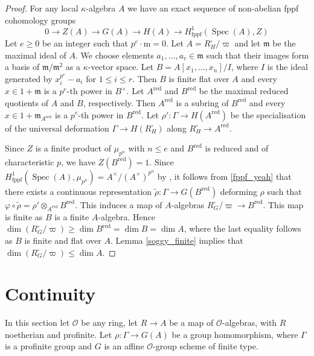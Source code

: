 \documentclass{amsart}
\theoremstyle{definition}
\theoremstyle{remark}
\newcommand{\stackcite}[1]{\cite[\href{https://stacks.math.columbia.edu/tag/#1}{Tag #1}]{stacks-project}}
\DeclareMathOperator{\Spec}{Spec}
\newcommand{\mm}{\mathfrak m}
\newcommand{\OO}{\mathcal O}
\newcommand{\md}{\mathrm m}
\newcommand{\red}{\mathrm{red}}
\begin{document}
\begin{proof} For any local $\kappa$-algebra $A$ we have an exact sequence of non-abelian fppf cohomology groups
\begin{equation}\label{fppf_yeah}
0\rightarrow Z(A) \rightarrow G(A) \rightarrow H(A) \rightarrow H^1_{\mathrm{fppf}}(\Spec(A), Z)
\end{equation}
Let $e\ge 0$ be an integer such that $p^e\cdot\md=0$. Let $A=R^{\square}_H/\varpi$ and let 
$\mm$ be the maximal ideal of $A$. We choose elements $a_1, \ldots, a_r\in \mm$ such that 
their images form a basis of $\mm/\mm^2$ as a $\kappa$-vector space. Let 
$B=A[x_1,\ldots, x_n]/I$, where $I$ is the ideal generated by $x_i^{p^e}-a_i$ for $1\le i \le r$.
Then $B$ is finite flat over $A$ and every $x\in 1+\mm$ is a $p^e$-th power in $B^{\times}$. 
Let $A^{\red}$ and $B^{\red}$ be the maximal reduced quotients of $A$ and $B$, respectively. 
Then $A^{\red}$ is a subring of $B^{\red}$ and every $x\in 1+\mm_{A^{\red}}$ is a $p^{e}$-th power
in $B^{\red}$. Let $\rho': \Gamma\rightarrow H(A^{\red})$ be the specialisation of
 the universal deformation $\Gamma \rightarrow H(R^{\square}_H)$ along $R^{\square}_H \rightarrow A^{\red}$.
 
Since $Z$ is a finite product of $\mu_{p^n}$ with $n\le e$ and $B^{\red}$ is reduced and of characteristic 
$p$, we have $Z(B^{\red})=1$. Since $H^1_{\mathrm{fppf}}(\Spec(A), \mu_{p^n}) = A^{\times}/ (A^{\times})^{p^n}$ by \stackcite{040Q}, it follows from \eqref{fppf_yeah} that there exists a continuous representation 
$\tilde{\rho}: \Gamma \rightarrow G(B^{\red})$ deforming $\rho$ such that 
$\varphi\circ \tilde{\rho} = \rho'\otimes_{A^{\red}} B^{\red}$. This induces a map 
of $A$-algebras $R^{\square}_G/\varpi \rightarrow B^{\red}$. This map is  finite as $B$ is 
a finite $A$-algebra. Hence $\dim (R^{\square}_G/\varpi)\ge \dim B^{\red}= \dim B =\dim A$, 
where the last equality follows as $B$ is finite and flat over $A$. 
Lemma \ref{soggy_finite} implies that $ \dim (R^{\square}_G/\varpi)\le \dim A$. 
\end{proof} 




 


\section{Continuity}\label{sec_cont}
In this section let $\OO$ be any ring, let $R\rightarrow A$ be a map of $\OO$-algebras, 
with $R$  noetherian and profinite. Let $\rho: \Gamma \rightarrow G(A)$ be a group 
homomorphism, where $\Gamma$ is a profinite group and $G$ is an affine $\OO$-group 
scheme of finite type.   
\end{document}
